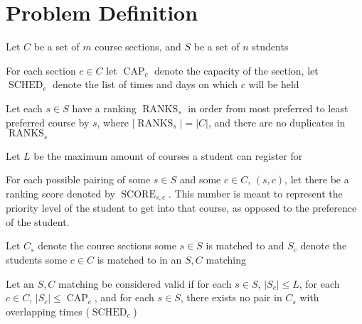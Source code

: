 \documentclass{article}
\newcommand{\caps}{\operatorname{CAP}}
\newcommand{\sched}{\operatorname{SCHED}}
\newcommand{\ranks}{\operatorname{RANKS}}
\newcommand{\score}{\operatorname{SCORE}}
\begin{document}
\section{Problem Definition}
\setlength\parindent{0pt}\par
Let $C$ be a set of $m$ course sections, and $S$ be a set of $n$ students\\\par
For each section $c \in C$ let $\caps_c$ denote the capacity of the section, let $\sched_c$ denote the list of times and days on which $c$ will be held\\\par
Let each $s \in S$ have a ranking $\ranks_s$ in order from most preferred to least preferred course by $s$, where $|\ranks_s| = |C|$, and there are no duplicates in $\ranks_s$ \\\par
Let $L$ be the maximum amount of courses a student can register for\\\par
For each possible pairing of some $s \in S$ and some $c \in C$, $(s, c)$, let there be a ranking score denoted by $\score_{s, c}$. This number is meant to represent the priority level of the student to get into that course, as opposed to the preference of the student. \\\par
Let $C_s$ denote the course sections some $s \in S$ is matched to and $S_c$ denote the students some $c \in C$ is matched to in an $S, C$ matching\\\par
Let an $S,C$ matching be considered valid if for each $s \in S$, $|S_c| \le L$, for each $c \in C$, $|S_c| \le \caps_c$, and for each $s \in S$, there exists no pair in $C_s$ with overlapping times ($\sched_c$)\\\par 

\end{document}
